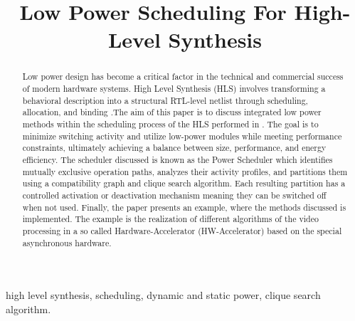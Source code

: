 \documentclass[conference]{IEEEtran}
\begin{document}
\title{Low Power Scheduling For High-Level Synthesis\\
}

\author{
}

\maketitle

\begin{abstract}
Low power design has become a critical factor in the technical and commercial success of modern hardware systems. High Level Synthesis (HLS) involves transforming a behavioral description into a structural RTL-level netlist through scheduling, allocation, and binding \cite{Ret} \cite{DDG92}.The aim of this paper is to discuss integrated low power methods within the scheduling process of the HLS performed in \cite{Ret}. The goal is to minimize switching activity and utilize low-power modules while meeting performance constraints, ultimately achieving a balance between size, performance, and energy efficiency. The scheduler discussed is known as the Power Scheduler \cite{article} which identifies mutually exclusive operation paths, analyzes their activity profiles, and partitions them using a compatibility graph and clique search algorithm. Each resulting partition has a controlled activation or deactivation mechanism meaning they can be switched off when not used. Finally, the paper presents an example, where the methods discussed is implemented. The example is the realization of different algorithms of the video processing in a so called Hardware-Accelerator (HW-Accelerator) based on the special asynchronous hardware.
\end{abstract}
\begin{IEEEkeywords}
high level synthesis, scheduling, dynamic and static power, clique search algorithm.
\end{IEEEkeywords}
\end{document}
